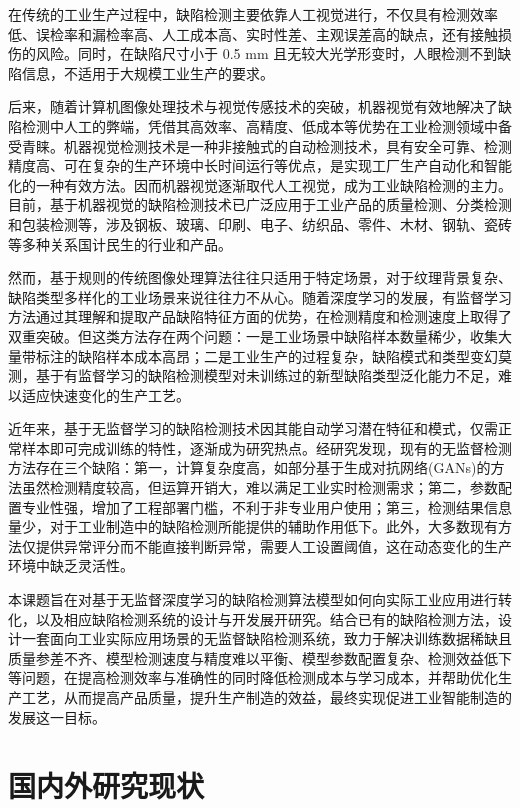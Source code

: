 \documentclass[
  ]{njuthesis}
\begin{document}
在传统的工业生产过程中，缺陷检测主要依靠人工视觉进行，不仅具有检测效率低、误检率和漏检率高、人工成本高、实时性差、主观误差高的缺点，还有接触损伤的风险\cite{[3]}。同时，在缺陷尺寸小于 0.5 mm 且无较大光学形变时，人眼检测不到缺陷信息，不适用于大规模工业生产的要求\cite{[4]}。

后来，随着计算机图像处理技术与视觉传感技术的突破，机器视觉有效地解决了缺陷检测中人工的弊端，凭借其高效率、高精度、低成本等优势在工业检测领域中备受青睐\cite{[5]}。机器视觉检测技术是一种非接触式的自动检测技术，具有安全可靠、检测精度高、可在复杂的生产环境中长时间运行等优点，是实现工厂生产自动化和智能化的一种有效方法\cite{[6]}。因而机器视觉逐渐取代人工视觉，成为工业缺陷检测的主力。目前，基于机器视觉的缺陷检测技术已广泛应用于工业产品的质量检测、分类检测和包装检测等，涉及钢板、玻璃、印刷、电子、纺织品、零件、木材、钢轨、瓷砖等多种关系国计民生的行业和产品\cite{[7]}。

然而，基于规则的传统图像处理算法往往只适用于特定场景，对于纹理背景复杂、缺陷类型多样化的工业场景来说往往力不从心。随着深度学习的发展，有监督学习方法通过其理解和提取产品缺陷特征方面的优势，在检测精度和检测速度上取得了双重突破。但这类方法存在两个问题：一是工业场景中缺陷样本数量稀少，收集大量带标注的缺陷样本成本高昂；二是工业生产的过程复杂，缺陷模式和类型变幻莫测，基于有监督学习的缺陷检测模型对未训练过的新型缺陷类型泛化能力不足，难以适应快速变化的生产工艺。

近年来，基于无监督学习的缺陷检测技术因其能自动学习潜在特征和模式，仅需正常样本即可完成训练的特性，逐渐成为研究热点。经研究发现，现有的无监督检测方法存在三个缺陷：第一，计算复杂度高，如部分基于生成对抗网络(GANs)的方法虽然检测精度较高，但运算开销大，难以满足工业实时检测需求；第二，参数配置专业性强，增加了工程部署门槛，不利于非专业用户使用；第三，检测结果信息量少，对于工业制造中的缺陷检测所能提供的辅助作用低下。此外，大多数现有方法仅提供异常评分而不能直接判断异常，需要人工设置阈值，这在动态变化的生产环境中缺乏灵活性。

本课题旨在对基于无监督深度学习的缺陷检测算法模型如何向实际工业应用进行转化，以及相应缺陷检测系统的设计与开发展开研究。结合已有的缺陷检测方法，设计一套面向工业实际应用场景的无监督缺陷检测系统，致力于解决训练数据稀缺且质量参差不齐、模型检测速度与精度难以平衡、模型参数配置复杂、检测效益低下等问题，在提高检测效率与准确性的同时降低检测成本与学习成本，并帮助优化生产工艺，从而提高产品质量，提升生产制造的效益，最终实现促进工业智能制造的发展这一目标。

\section{国内外研究现状}
\end{document}
